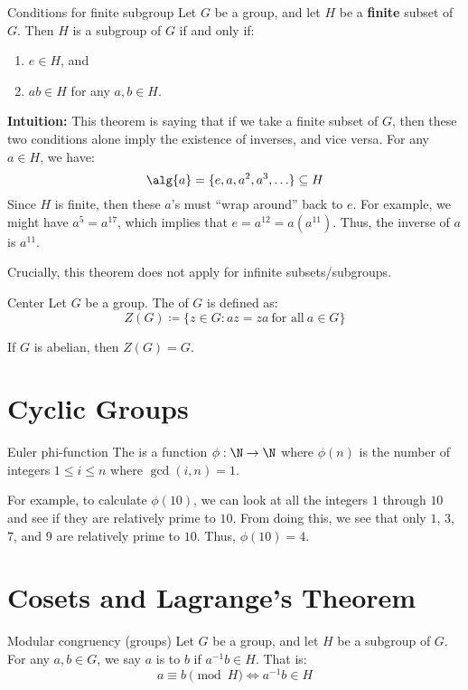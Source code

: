 \begin{thmbox}{Conditions for finite subgroup}{}
    Let $G$ be a group, and let $H$ be a \textbf{finite} subset of $G$. Then $H$ is a subgroup of $G$ if and only if:
    \begin{enumerate}
        \item $e \in H$, and
        \item $ab \in H$ for any $a,b \in H$.
    \end{enumerate}
    \tcblower
    \textbf{Intuition:} This theorem is saying that if we take a finite subset of $G$, then these two conditions alone imply the existence of inverses, and vice versa. For any $a \in H$, we have:
    \[ \alg{a} = \{e, a, a^2, a^3, \ldots \} \subseteq H \]
    Since $H$ is finite, then these $a$'s must ``wrap around'' back to $e$. For example, we might have $a^5 = a^{17}$, which implies that $e = a^{12} = a(a^{11})$. Thus, the inverse of $a$ is $a^{11}$.
\end{thmbox}

Crucially, this theorem does not apply for infinite subsets/subgroups. 

\begin{dfnbox}{Center}{}
    Let $G$ be a group. The  of $G$ is defined as:
    \[ Z(G) \coloneq \{ z \in G : az = za\ \text{for all}\ a \in G \} \]
\end{dfnbox}

If $G$ is abelian, then $Z(G) = G$.


\section{Cyclic Groups}

\begin{dfnbox}{Euler phi-function}{}
    The  is a function $\phi : \N \to \N$ where $\phi(n)$ is the number of integers $1 \leq i \leq n$ where $\gcd(i, n) = 1$.
\end{dfnbox}

For example, to calculate $\phi(10)$, we can look at all the integers $1$ through $10$ and see if they are relatively prime to $10$. From doing this, we see that only $1$, $3$, $7$, and $9$ are relatively prime to $10$. Thus, $\phi(10) = 4$.


\section{Cosets and Lagrange's Theorem}
\begin{dfnbox}{Modular congruency (groups)}{}
    Let $G$ be a group, and let $H$ be a subgroup of $G$. For any $a,b \in G$, we say $a$ is  to $b$  if $a^{-1} b \in H$. That is:
    \[ a \equiv b \pmod{H} \iff a^{-1}b \in H \]
\end{dfnbox}

